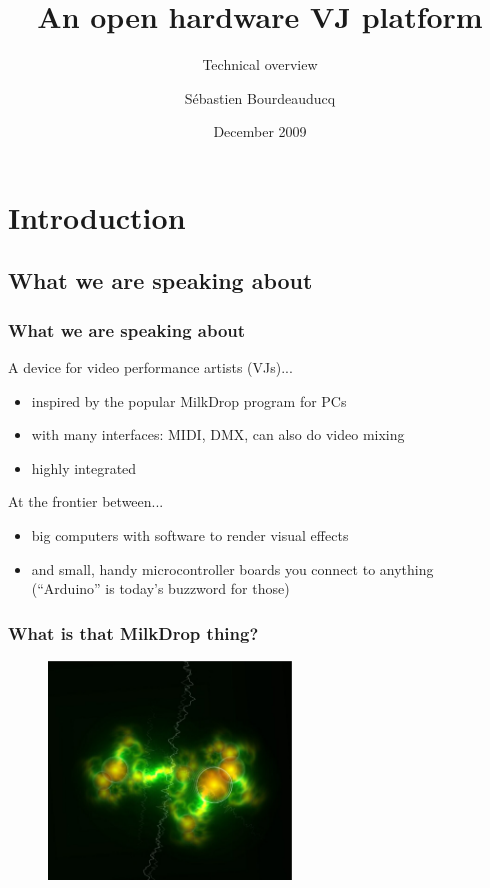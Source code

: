 \documentclass{beamer}
\title{An open hardware VJ platform}
\subtitle{Technical overview}
\author{S\'ebastien Bourdeauducq}
\date{December 2009}
\begin{document}

\section{Introduction}
\subsection{What we are speaking about}
\frame
{
  \frametitle{What we are speaking about}
A device for video performance artists (VJs)...
  \begin{itemize}
  \item inspired by the popular MilkDrop program for PCs
  \item with many interfaces: MIDI, DMX, can also do video mixing
  \item highly integrated
  \end{itemize}

At the frontier between...
  \begin{itemize}
  \item big computers with software to render visual effects
  \item and small, handy microcontroller boards you connect to anything\\(``Arduino'' is today's buzzword for those)
  \end{itemize}
}

\frame
{
  \frametitle{What is that MilkDrop thing?}
  \begin{figure}[H]
  \includegraphics[height=58mm]{milkdrop1.eps}
  \end{figure}
}
\end{document}
